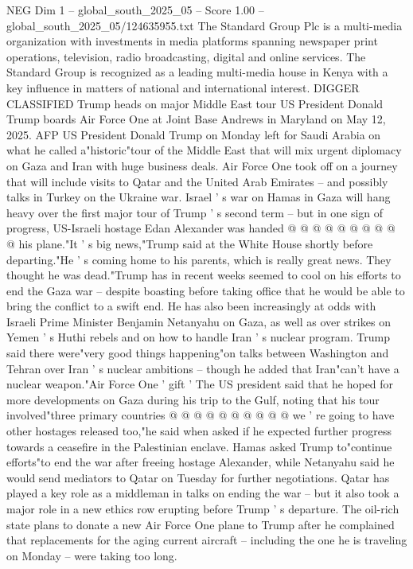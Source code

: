 \begin{textsample}{NEG Dim 1 – global\_south\_2025\_05 – Score 1.00 – global\_south\_2025\_05/124635955.txt}  \label{ex:f1_neg_386}
The Standard Group Plc is a multi-media organization with investments in media platforms spanning newspaper print operations, television, radio broadcasting, digital and online services.
The Standard Group is recognized as a leading multi-media house in Kenya with a key influence in matters of national and international interest.
DIGGER CLASSIFIED Trump heads on major Middle East tour US President Donald Trump boards Air Force One at Joint Base Andrews in Maryland on May 12, 2025.
AFP US President Donald Trump on Monday left for Saudi Arabia on what he called a"historic"tour of the Middle East that will mix urgent diplomacy on Gaza and Iran with huge business deals.
Air Force One took off on a journey that will include visits to Qatar and the United Arab Emirates -- and possibly talks in Turkey on the Ukraine war.
Israel ' s war on Hamas in Gaza will hang heavy over the first major tour of Trump ' s second term -- but in one sign of progress, US-Israeli hostage Edan Alexander was handed @ @ @ @ @ @ @ @ @ @ his plane."It ' s big news,"Trump said at the White House shortly before departing."He ' s coming home to his parents, which is really great news.
They thought he was dead."Trump has in recent weeks seemed to cool on his efforts to end the Gaza war -- despite boasting before taking office that he would be able to bring the conflict to a swift end.
He has also been increasingly at odds with Israeli Prime Minister Benjamin Netanyahu on Gaza, as well as over strikes on Yemen ' s Huthi rebels and on how to handle Iran ' s nuclear program.
Trump said there were"very good things happening"on talks between Washington and Tehran over Iran ' s nuclear ambitions -- though he added that Iran"can't have a nuclear weapon."Air Force One ' gift ' The US president said that he hoped for more developments on Gaza during his trip to the Gulf, noting that his tour involved"three primary countries @ @ @ @ @ @ @ @ @ @ we ' re going to have other hostages released too,"he said when asked if he expected further progress towards a ceasefire in the Palestinian enclave.
Hamas asked Trump to"continue efforts"to end the war after freeing hostage Alexander, while Netanyahu said he would send mediators to Qatar on Tuesday for further negotiations.
Qatar has played a key role as a middleman in talks on ending the war -- but it also took a major role in a new ethics row erupting before Trump ' s departure.
The oil-rich state plans to donate a new Air Force One plane to Trump after he complained that replacements for the aging current aircraft -- including the one he is traveling on Monday -- were taking too long.

\end{textsample}
